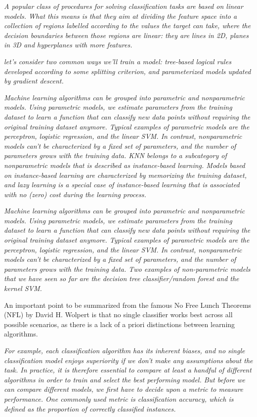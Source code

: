 \textit{A popular class of procedures for solving classification tasks are based on linear models. What this means is that they aim at dividing the feature space into a collection of regions labelled according to the values the target can take, where the decision boundaries between those regions are linear: they are lines in 2D, planes in 3D and hyperplanes with more features.}

\textit{let's consider two common ways we'll train a model: tree-based logical rules developed according to some splitting criterion, and parameterized models updated by gradient descent.}

\textit{Machine learning algorithms can be grouped into parametric and nonparametric models. Using parametric models, we estimate parameters from the training dataset to learn a function that can classify new data points without requiring the original training dataset anymore. Typical examples of parametric models are the perceptron, logistic regression, and the linear SVM. In contrast, nonparametric models can't be characterized by a fixed set of parameters, and the number of parameters grows with the training data. KNN belongs to a subcategory of nonparametric models that is described as instance-based learning. Models based on instance-based learning are characterized by memorizing the training dataset, and lazy learning is a special case of instance-based learning that is associated with no (zero) cost during the learning process.}

\textit{Machine learning algorithms can be grouped into parametric and nonparametric models. Using parametric models, we estimate parameters from the training dataset to learn a function that can classify new data points without requiring the original training dataset anymore. Typical examples of parametric models are the perceptron, logistic regression, and the linear SVM. In contrast, nonparametric models can't be characterized by a fixed set of parameters, and the number of parameters grows with the training data. Two examples of non-parametric models that we have seen so far are the decision tree classifier/random forest and the kernel SVM.}

An important point to be summarized from the famous No Free Lunch Theorems (NFL)\cite{Wolpert1996,Wolpert1997} by David H. Wolpert is that no single classifier works best across all possible scenarios, as there is a lack of a priori distinctions between learning algorithms.

\textit{For example, each classification algorithm has its inherent biases, and no single classification model enjoys superiority if we don't make any assumptions about the task. In practice, it is therefore essential to compare at least a handful of different algorithms in order to train and select the best performing model. But before we can compare different models, we first have to decide upon a metric to measure performance. One commonly used metric is classification accuracy, which is defined as the proportion of correctly classified instances.}

